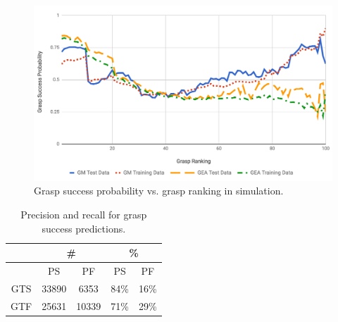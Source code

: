 \begin{figure}[hb]
  \includegraphics[width=\linewidth]{images/successvsranking.png}
  \caption{Grasp success probability vs. grasp ranking in simulation.}
  \label{fig:successvsranking}
\end{figure}

\begin{table}[h]
\centering
\caption{Precision and recall for grasp success predictions.}
\label{fig:predictions}
\begin{tabular}{|c|c|c|c|c|}
\hline
    & \multicolumn{2}{c|}{\#} & \multicolumn{2}{c|}{\%} \\ \hline
    & PS         & PF         & PS         & PF         \\ \hline
GTS & 33890      & 6353       & 84\%       & 16\%       \\ \hline
GTF & 25631      & 10339     & 71\%       & 29\%       \\ \hline
\end{tabular}
\end{table}
